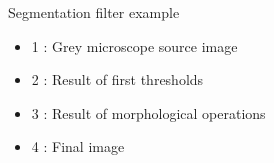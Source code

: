 Segmentation filter example
\begin{itemize}
\item 1 : Grey microscope source image
\item 2 : Result of first thresholds
\item 3 : Result of morphological operations
\item 4 : Final image
\end{itemize}
    
  
